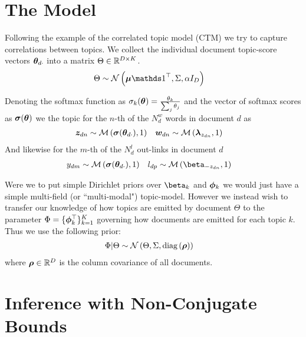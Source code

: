 

\newcommand \thdo { { \vv{\theta}_{d\cdot} } }
\newcommand \thok { { \vv{\theta}_{\cdot k} } }
\newcommand \phok { { \vv{\phi}_{\cdot k} } }
\newcommand \phdo { { \vv{\phi}_{d\cdot} } }


\section{The Model}
Following the example of the correlated topic model (CTM)\cite{Blei2006} we try to capture correlations between topics. We collect the individual document topic-score vectors $\thdo$ into a matrix $\Theta \in { \mathbb{R}^{D \times K} }$. 
\begin{align}
\Theta &\sim \mnor{\vv{\mu}\one\T}{\Sigma}{\alpha I_D}
\end{align}

Denoting the softmax function as $\sigma_k(\bm \theta) = \frac{\theta_k}{\sum_j \theta_j}$ and the vector of softmax scores as $\bm \sigma(\bm \theta)$ we 
the topic for the $n$-th of the $N^w_d$ words in document $d$ as
\begin{align}
\zdn & \sim \muln{\vv{\sigma}(\thdo)}{1} &
\wdn & \sim \muln{\vv{\lambda}_{z_{dn}}}{1}
\end{align}
And likewise for the $m$-th of the $N^l_d$ out-links in document $d$
\begin{align}
y_{dm} & \sim \muln{\vv{\sigma}(\thdo)}{1} &
l_{dp} & \sim \muln{\vv{\beta}_{- z_{dn}}}{1}
\end{align}

Were we to put simple Dirichlet priors over $\vv{\beta}_k$ and $\bm \phi_k$ we would just have a simple multi-field (or ``multi-modal") topic-model\cite{Salomatin2009}. However we instead wish to transfer our knowledge of how topics are emitted by document $\Theta$ to the parameter $\Phi = \{ \bm \phi_k^\top \}_{k=1}^K$ governing how documents are emitted for each topic $k$. Thus we use the following prior:
\begin{align}
\Phi|\Theta & \sim \mathcal{N} \left(\Theta, \Sigma, \text{diag} \left( {\bm \rho} \right)\right)
\end{align}
where $\bm \rho \in { \mathbb{R}^{D} }$ is the column covariance of all documents. 

\section{Inference with Non-Conjugate Bounds}
